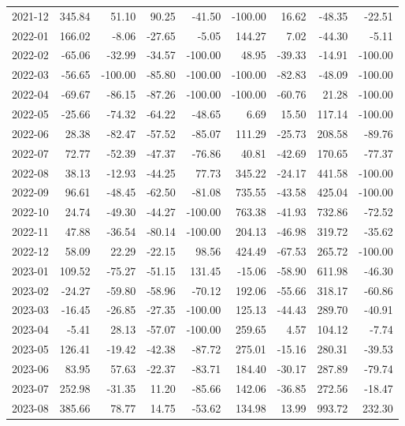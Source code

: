 \begin{table}[ht]
\begin{tabular}{lrrrrrrrr}
  2021-12 & 345.84 & 51.10 & 90.25 & -41.50 & -100.00 & 16.62 & -48.35 & -22.51 \\ 
  2022-01 & 166.02 & -8.06 & -27.65 & -5.05 & 144.27 & 7.02 & -44.30 & -5.11 \\ 
  2022-02 & -65.06 & -32.99 & -34.57 & -100.00 & 48.95 & -39.33 & -14.91 & -100.00 \\ 
  2022-03 & -56.65 & -100.00 & -85.80 & -100.00 & -100.00 & -82.83 & -48.09 & -100.00 \\ 
  2022-04 & -69.67 & -86.15 & -87.26 & -100.00 & -100.00 & -60.76 & 21.28 & -100.00 \\ 
  2022-05 & -25.66 & -74.32 & -64.22 & -48.65 & 6.69 & 15.50 & 117.14 & -100.00 \\ 
  2022-06 & 28.38 & -82.47 & -57.52 & -85.07 & 111.29 & -25.73 & 208.58 & -89.76 \\ 
  2022-07 & 72.77 & -52.39 & -47.37 & -76.86 & 40.81 & -42.69 & 170.65 & -77.37 \\ 
  2022-08 & 38.13 & -12.93 & -44.25 & 77.73 & 345.22 & -24.17 & 441.58 & -100.00 \\ 
  2022-09 & 96.61 & -48.45 & -62.50 & -81.08 & 735.55 & -43.58 & 425.04 & -100.00 \\ 
  2022-10 & 24.74 & -49.30 & -44.27 & -100.00 & 763.38 & -41.93 & 732.86 & -72.52 \\ 
  2022-11 & 47.88 & -36.54 & -80.14 & -100.00 & 204.13 & -46.98 & 319.72 & -35.62 \\ 
  2022-12 & 58.09 & 22.29 & -22.15 & 98.56 & 424.49 & -67.53 & 265.72 & -100.00 \\ 
  2023-01 & 109.52 & -75.27 & -51.15 & 131.45 & -15.06 & -58.90 & 611.98 & -46.30 \\ 
  2023-02 & -24.27 & -59.80 & -58.96 & -70.12 & 192.06 & -55.66 & 318.17 & -60.86 \\ 
  2023-03 & -16.45 & -26.85 & -27.35 & -100.00 & 125.13 & -44.43 & 289.70 & -40.91 \\ 
  2023-04 & -5.41 & 28.13 & -57.07 & -100.00 & 259.65 & 4.57 & 104.12 & -7.74 \\ 
  2023-05 & 126.41 & -19.42 & -42.38 & -87.72 & 275.01 & -15.16 & 280.31 & -39.53 \\ 
  2023-06 & 83.95 & 57.63 & -22.37 & -83.71 & 184.40 & -30.17 & 287.89 & -79.74 \\ 
  2023-07 & 252.98 & -31.35 & 11.20 & -85.66 & 142.06 & -36.85 & 272.56 & -18.47 \\ 
  2023-08 & 385.66 & 78.77 & 14.75 & -53.62 & 134.98 & 13.99 & 993.72 & 232.30 \\ 

\end{tabular}
\end{table}
